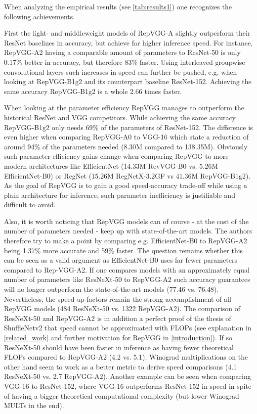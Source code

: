 When analyzing the empirical results (see \autoref{tab:results1}) one recognizes the following achievements. 

First the light- and middleweight models of RepVGG-A slightly outperform their ResNet \cite{KaimingHe.2015} baselines in accuracy, but achieve far higher inference speed. For instance, RepVGG-A2 having a comparable amount of parameters to ResNet-50 is only 0.17\% better in accuracy, but therefore 83\% faster. Using interleaved groupwise convolutional layers such increases in speed can further be pushed, e.g. when looking at RepVGG-B1g2 and its counterpart baseline ResNet-152. Achieving the same accuracy RepVGG-B1g2 is a whole 2.66 times faster. 

When looking at the parameter efficiency RepVGG manages to outperform the historical ResNet \cite{KaimingHe.2015} and VGG \cite{KarenSimonyan.2014} competitors. While achieving the same accuracy RepVGG-B1g2 only needs 69\% of the parameters of ResNet-152. The difference is even higher when comparing RepVGG-A0 to VGG-16 which state a reduction of around 94\% of the parameters needed (8.30M compared to 138.35M). Obviously such parameter efficiency gains change when comparing RepVGG to more modern architectures like EfficientNet \cite{LeMingxingTan.2019} (14.33M RevVGG-B0 vs. 5.26M EfficientNet-B0) or RegNet \cite{IlijaRadosavovic.2020} (15.26M RegNetX-3.2GF vs 41.36M RepVGG-B1g2). As the goal of RepVGG is to gain a good speed-accuracy trade-off while using a plain architecture for inference, such parameter inefficiency is justifiable and difficult to avoid. 

Also, it is worth noticing that RepVGG models can of course - at the cost of the number of parameters needed - keep up with state-of-the-art models. The authors therefore try to make a point by comparing e.g. EfficientNet-B0 to RepVGG-A2 being 1.37\% more accurate and 59\% faster. The question remains whether this can be seen as a valid argument as EfficientNet-B0 uses far fewer parameters compared to Rep-VGG-A2. If one compares models with an approximately equal number of parameters like ResNeXt-50 to RepVGG-A2 such accuracy guarantees will no longer outperform the state-of-the-art models (77.46 vs. 76.48). Nevertheless, the speed-up factors remain the strong accomplishment of all RepVGG models (484 ResNeXt-50 vs. 1322 RepVGG-A2). The comparison of ResNeXt-50 and RepVGG-A2 is in addition a perfect proof of the thesis of ShuffleNetv2 \cite{NingningMa.2018} that speed cannot be approximated with FLOPs (see explanation in \autoref{related_work} and further motivation for RepVGG in \autoref{introduction}). If so ResNeXt-50 should have been faster in inference as having fewer theoretical FLOPs compared to RepVGG-A2 (4.2 vs. 5.1). Winograd multiplications \cite{AndrewLavin.2015} on the other hand seem to work as a better metric to derive speed comparisons (4.1 ResNeXt-50 vs. 2.7 RepVGG-A2). Another example can be seen when comparing VGG-16 to ResNet-152, where VGG-16 outperforms ResNet-152 in speed in spite of having a bigger theoretical computational complexity (but lower Winograd MULTs in the end).

